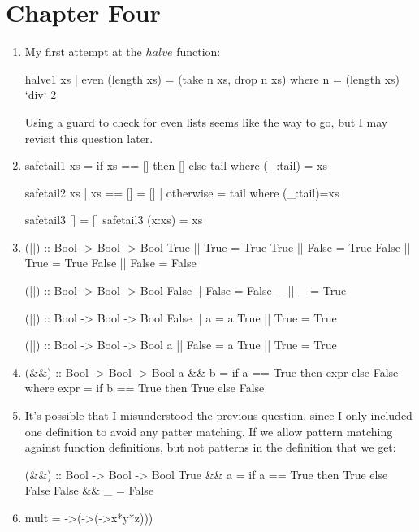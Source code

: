 \documentclass{article}
\begin{document}
\section{Chapter Four}
\begin{enumerate}
\item My first attempt at the $halve$ function:
\begin{code}
halve1 xs | even (length xs) = (take n xs, drop n xs) where n = (length xs) `div` 2
\end{code}
Using a guard to check for even lists seems like the way to go, but I may revisit this question later.

\item 
\begin{code}
safetail1 xs = if xs == [] then [] else tail where (_:tail) = xs

safetail2 xs | xs == []  = []
             | otherwise = tail where (_:tail)=xs
             
safetail3 []     = []
safetail3 (x:xs) = xs
\end{code}

\item
\begin{code}
(||) :: Bool -> Bool -> Bool
True  || True  = True
True  || False = True
False || True  = True
False || False = False

(||) :: Bool -> Bool -> Bool
False || False = False
_     ||    _  = True 

(||) :: Bool -> Bool -> Bool
False || a    = a
True  || True = True

(||) :: Bool -> Bool -> Bool
a    || False = a
True || True  = True
\end{code}

\item 
\begin{code}
(&&) :: Bool -> Bool -> Bool
a && b = if a == True then expr else False
 	 where
            expr = if b == True then True else False
\end{code}

\item It's possible that I misunderstood the previous question, since I only included one definition to avoid any patter matching. If we allow pattern matching against function definitions, but not patterns in the definition that we get:
\begin{code}
(&&) :: Bool -> Bool -> Bool
True && a  = if a == True then True else False
False && _ = False
\end{code}

\item 
\begin{code}
mult = \x->(\y->(\z->x*y*z)))
\end{code}
\end{enumerate}
\end{document}
